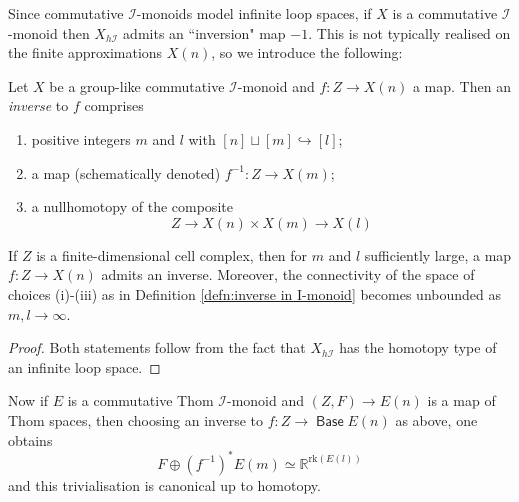 \documentclass{TPmod}
\def\bR{\mathbb{R}}
\DeclareMathOperator{\Base}{\mathsf{Base}}
\newcommand{\cI}{\mathcal{I}}
\renewcommand{\cong}{\simeq}
\numberwithin{equation}{section}
\begin{document}
Since commutative $\cI$-monoids model infinite loop spaces, if $X$ is a commutative $\cI$-monoid then $X_{h\cI}$ admits an ``inversion" map $-1$.  This is not typically realised on the finite approximations $X(n)$, so we introduce the following:

\begin{defn}\label{defn:inverse in  I-monoid}
    Let $X$ be a group-like commutative $\cI$-monoid and $f: Z \to X(n)$ a map.  Then an \emph{inverse} to $f$ comprises
    \begin{enumerate}
        \item positive integers $m$ and $l$ with $[n] \sqcup [m] \hookrightarrow [l]$;
        \item a map (schematically denoted) $f^{-1}: Z \to X(m)$;
        \item a nullhomotopy of the composite 
        \[
        Z \to X(n)  \times X(m) \to X(l)
        \]
    \end{enumerate}
\end{defn}


\begin{lem}\label{lem:inverse maps to I-monoids exist}
    If $Z$ is a finite-dimensional cell complex, then for $m$ and $l$ sufficiently large, a map $f: Z\to X(n)$  admits an inverse. Moreover, the connectivity of the space of choices (i)-(iii) as in Definition \ref{defn:inverse in  I-monoid} becomes unbounded as $m,l \to \infty$.
\end{lem}

\begin{proof}
    Both statements follow from the fact that $X_{h\cI}$ has the homotopy type of an infinite loop space.
\end{proof}

Now if $E$ is a commutative Thom $\cI$-monoid and $(Z,F) \to E(n)$ is a map of Thom spaces, then choosing an inverse to $f: Z \to \Base E(n)$ as above, one obtains 
\begin{equation}\label{eqn:trivialisation from inverse monoid map}
F \oplus (f^{-1})^* E(m) \cong \bR^{\mathrm{rk}(E(l))}
\end{equation}
and this trivialisation is canonical up to homotopy.
\end{document}
